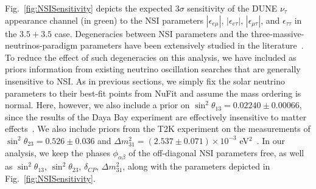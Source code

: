 \documentclass[aps,prd,onecolumn,nofootinbib,superscriptaddress, 11pt]{revtex4}
\begin{document}
Fig.~\ref{fig:NSISensitivity} depicts the expected $3\sigma$ sensitivity of the DUNE $\nu_\tau$ appearance channel (in green) to the NSI parameters $|\epsilon_{e\mu}|$, $|\epsilon_{e\tau}|$, $|\epsilon_{\mu\tau}|$, and $\epsilon_{\tau\tau}$ in the $3.5+3.5$ case. Degeneracies between NSI parameters and the three-massive-neutrinos-paradigm parameters have been extensively studied in the literature~\cite{Friedland:2004ah,Friedland:2005vy,Friedland:2006pi,Kopp:2010qt,GonzalezGarcia:2011my,Coloma:2011rq,deGouvea:2015ndi,Coloma:2015kiu,Liao:2016hsa,Bakhti:2016prn,Coloma:2016gei,deGouvea:2016pom,Blennow:2016etl,Blennow:2016jkn,Fukasawa:2016lew,Ghosh:2017ged}. To reduce the effect of such degeneracies on this analysis, we have included as priors information from existing neutrino oscillation searches that are generally insensitive to NSI. As in previous sections, we simply fix the solar neutrino parameters to their best-fit points from NuFit and assume the mass ordering is normal. Here, however, we also include a prior on $\sin^2\theta_{13} = 0.02240 \pm 0.00066$, since the results of the Daya Bay experiment are effectively insensitive to matter effects~\cite{Adey:2018zwh}. We also include priors from the T2K experiment on the measurements of $\sin^2\theta_{23} = 0.526 \pm 0.036$ and $\Delta m_{31}^2 = (2.537 \pm 0.071) \times 10^{-3}$ eV$^2$~\cite{Abe:2018wpn}. In our analysis, we keep the phases $\phi_{\alpha\beta}$ of the off-diagonal NSI parameters free, as well as $\sin^2\theta_{13}$, $\sin^2\theta_{23}$, $\delta_{CP}$, $\Delta m_{31}^2$, along with  the parameters depicted in Fig.~\ref{fig:NSISensitivity}.
\end{document}
